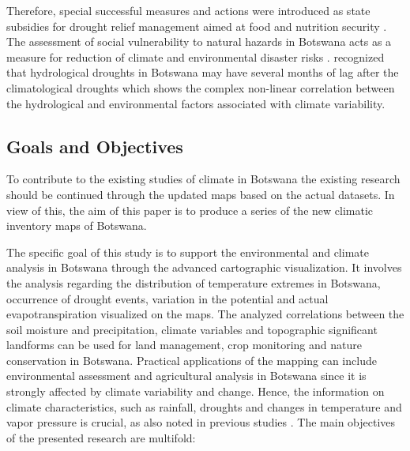 \documentclass[ijgi,article,submit,pdftex,moreauthors]{Definitions/mdpi}
\begin{document}
Therefore, special successful measures and actions were introduced as state subsidies for drought relief management aimed at food and nutrition security \cite{Belbase}. The assessment of social vulnerability to natural hazards in Botswana acts as a measure for reduction of climate and environmental disaster risks \cite{Dintwa}. \cite{Byakatonda2018a} recognized that hydrological droughts in Botswana may have several months of lag after the climatological droughts which shows the complex non-linear correlation between the hydrological and environmental factors associated with climate variability. 

\subsection{Goals and Objectives}
To contribute to the existing studies of climate in Botswana the existing research should be continued through the updated maps based on the actual datasets. In view of this, the aim of this paper is to produce a series of the new climatic inventory maps of Botswana. 

The specific goal of this study is to support the environmental and climate analysis in Botswana through the advanced cartographic visualization. It involves the analysis regarding the distribution of temperature extremes in Botswana, occurrence of drought events, variation in the potential and actual evapotranspiration visualized on the maps. The analyzed correlations between the soil moisture and precipitation, climate variables and topographic significant landforms can be used for land management, crop monitoring and nature conservation in Botswana. Practical applications of the mapping can include environmental assessment and agricultural analysis in Botswana since it is strongly affected by climate variability and change. Hence, the information on climate characteristics, such as rainfall, droughts and changes in temperature and vapor pressure is crucial, as also noted in previous studies \cite{Maruatona}. The main objectives of the presented research are multifold:
\end{document}
